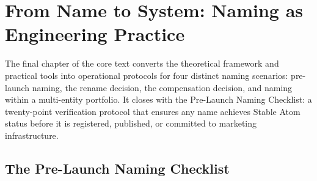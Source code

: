 \documentclass[12pt, openany]{book}
\theoremstyle{thmstyle}
\theoremstyle{defstyle}
\begin{document}
\chapter{From Name to System: Naming as Engineering Practice}

\begin{keybox}
The final chapter of the core text converts the theoretical framework and practical tools into operational protocols for four distinct naming scenarios: pre-launch naming, the rename decision, the compensation decision, and naming within a multi-entity portfolio. It closes with the Pre-Launch Naming Checklist: a twenty-point verification protocol that ensures any name achieves Stable Atom status before it is registered, published, or committed to marketing infrastructure.
\end{keybox}

\section{The Pre-Launch Naming Checklist}
\end{document}
